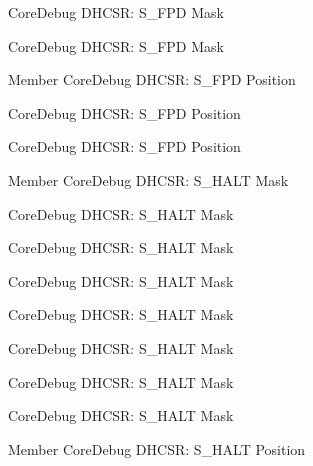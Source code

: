 \begin{DoxyRefList}
\label{deprecated__deprecated000014}%
%
Core\+Debug DHCSR\+: S\+\_\+\+FPD Mask 

\label{deprecated__deprecated000567}%
%
Core\+Debug DHCSR\+: S\+\_\+\+FPD Mask  
\item[Member \doxylink{group__CMSIS__SCB_ga620b141720c475f5bde4138855c6ed83}{Core\+Debug\+\_\+\+DHCSR\+\_\+\+S\+\_\+\+FPD\+\_\+\+Pos} ]\label{deprecated__deprecated000464}%
%
Core\+Debug DHCSR\+: S\+\_\+\+FPD Position 

\label{deprecated__deprecated000013}%
%
Core\+Debug DHCSR\+: S\+\_\+\+FPD Position 

\label{deprecated__deprecated000566}%
%
Core\+Debug DHCSR\+: S\+\_\+\+FPD Position  
\item[Member \doxylink{group__CMSIS__CoreDebug_ga9f881ade3151a73bc5b02b73fe6473ca}{Core\+Debug\+\_\+\+DHCSR\+\_\+\+S\+\_\+\+HALT\+\_\+\+Msk} ]\label{deprecated__deprecated000026}%
%
Core\+Debug DHCSR\+: S\+\_\+\+HALT Mask 

\label{deprecated__deprecated000390}%
%
Core\+Debug DHCSR\+: S\+\_\+\+HALT Mask 

\label{deprecated__deprecated000118}%
%
Core\+Debug DHCSR\+: S\+\_\+\+HALT Mask 

\label{deprecated__deprecated000477}%
%
Core\+Debug DHCSR\+: S\+\_\+\+HALT Mask 

\label{deprecated__deprecated000257}%
%
Core\+Debug DHCSR\+: S\+\_\+\+HALT Mask 

\label{deprecated__deprecated000172}%
%
Core\+Debug DHCSR\+: S\+\_\+\+HALT Mask 

\label{deprecated__deprecated000314}%
%
Core\+Debug DHCSR\+: S\+\_\+\+HALT Mask 

\label{deprecated__deprecated000579}%
%
Core\+Debug DHCSR\+: S\+\_\+\+HALT Mask  
\item[Member \doxylink{group__CMSIS__CoreDebug_ga760a9a0d7f39951dc3f07d01f1f64772}{Core\+Debug\+\_\+\+DHCSR\+\_\+\+S\+\_\+\+HALT\+\_\+\+Pos} ]\label{deprecated__deprecated000025}%
%
Core\+Debug DHCSR\+: S\+\_\+\+HALT Position 


\end{DoxyRefList}
